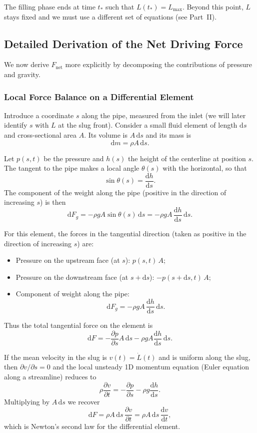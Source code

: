 \documentclass[11pt]{article}
\begin{document}
The filling phase ends at time $t_\ast$ such that $L(t_\ast) = L_{\max}$.
Beyond this point, $L$ stays fixed and we must use a different set of
equations (see Part~II).

\subsection{Detailed Derivation of the Net Driving Force}

We now derive $F_{\text{net}}$ more explicitly by decomposing the contributions
of pressure and gravity.

\subsubsection*{Local Force Balance on a Differential Element}

Introduce a coordinate $s$ along the pipe, measured from the inlet (we will
later identify $s$ with $L$ at the slug front). Consider a small fluid element
of length $\mathrm{d}s$ and cross-sectional area $A$. Its volume is
$A\,\mathrm{d}s$ and its mass is
\[
\mathrm{d}m = \rho A\,\mathrm{d}s.
\]

Let $p(s,t)$ be the pressure and $h(s)$ the height of the centerline at position
$s$. The tangent to the pipe makes a local angle $\theta(s)$ with the horizontal,
so that
\[
\sin\theta(s) = \frac{\mathrm{d}h}{\mathrm{d}s}.
\]
The component of the weight along the pipe (positive in the direction of
increasing $s$) is then
\[
\mathrm{d}F_g
  = -\rho g A \sin\theta(s)\,\mathrm{d}s
  = -\rho g A\,\frac{\mathrm{d}h}{\mathrm{d}s}\,\mathrm{d}s.
\]

For this element, the forces in the tangential direction (taken as positive in
the direction of increasing $s$) are:
\begin{itemize}
  \item Pressure on the upstream face (at $s$): $p(s,t)\,A$;
  \item Pressure on the downstream face (at $s + \mathrm{d}s$):
        $-p(s+\mathrm{d}s,t)\,A$;
  \item Component of weight along the pipe:
        \[
        \mathrm{d}F_g
        = -\rho g A\,\frac{\mathrm{d}h}{\mathrm{d}s}\,\mathrm{d}s.
        \]
\end{itemize}
Thus the total tangential force on the element is
\[
\mathrm{d}F
= -\frac{\partial p}{\partial s} A\,\mathrm{d}s
  - \rho g A \frac{\mathrm{d}h}{\mathrm{d}s}\,\mathrm{d}s.
\]

If the mean velocity in the slug is $v(t) = \dot L(t)$ and is uniform along the
slug, then $\partial v/\partial s = 0$ and the local unsteady 1D momentum
equation (Euler equation along a streamline) \cite{white_fm} reduces to
\[
\rho \frac{\partial v}{\partial t}
  = -\frac{\partial p}{\partial s} - \rho g \frac{\mathrm{d}h}{\mathrm{d}s}.
\]
Multiplying by $A\,\mathrm{d}s$ we recover
\[
\mathrm{d}F = \rho A\,\mathrm{d}s \,\frac{\partial v}{\partial t}
           = \rho A\,\mathrm{d}s \,\frac{\mathrm{d}v}{\mathrm{d}t},
\]
which is Newton's second law for the differential element.
\end{document}
